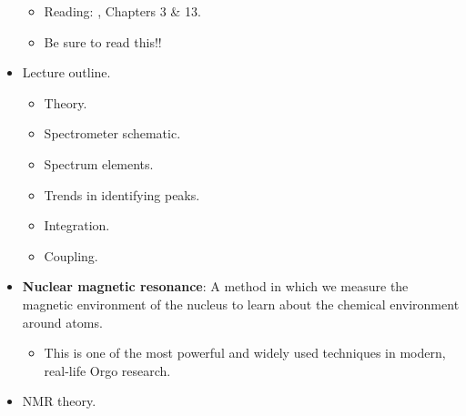 \documentclass[../notes.tex]{subfiles}
\begin{document}
\begin{itemize}
\begin{itemize}
        \item Reading: \textcite{bib:Clayden}, Chapters 3 \& 13.
        \item Be sure to read this!!
    \end{itemize}
    \item Lecture outline.
    \begin{itemize}
        \item Theory.
        \item Spectrometer schematic.
        \item Spectrum elements.
        \item Trends in identifying peaks.
        \item Integration.
        \item Coupling.
    \end{itemize}
    \item \textbf{Nuclear magnetic resonance}: A method in which we measure the magnetic environment of the nucleus to learn about the chemical environment around atoms.
    \begin{itemize}
        \item This is one of the most powerful and widely used techniques in modern, real-life Orgo research.
    \end{itemize}
    \item NMR theory.
    \begin{figure}[h!]
        \centering
\end{figure}
\end{itemize}
\end{document}
